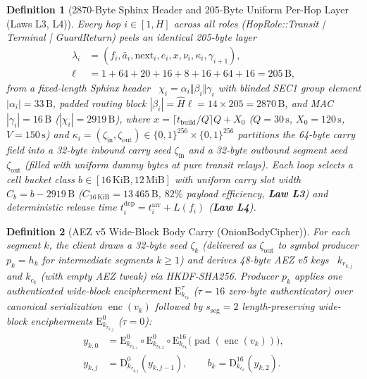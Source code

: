 \documentclass[journal]{IEEEtran}
\newtheorem{definition}{Definition}
\DeclareRobustCommand{\code}[1]{{\ttfamily\renewcommand{\_}{\textunderscore\allowbreak}#1}}
\begin{document}
\begin{definition}[2870-Byte Sphinx Header and 205-Byte Uniform Per-Hop Layer (Laws L3, L4)]\label{def:sphinx-header}
Every hop $i\in[1,H]$ across all roles (\code{HopRole::Transit | Terminal | GuardReturn})
peels an identical 205-byte layer
\[
\begin{aligned}
  \lambda_i &= (f_i,\bar{a}_i,\mathrm{next}_i,e_i,x,\nu_i,\kappa_i,\gamma_{i+1}),\\
  \ell &= 1+64+20+16+8+16+64+16=205\,\mathrm{B},
\end{aligned}
\]
from a fixed-length Sphinx header~\cite{Danezis2009} $\chi_i=\alpha_i\Vert\beta_i\Vert\gamma_i$ with blinded SEC1 group element $|\alpha_i|=33\,\mathrm{B}$, padded routing block $|\beta_i|=\hat{H}\ell=14\times 205=2870\,\mathrm{B}$, and MAC $|\gamma_i|=16\,\mathrm{B}$ ($|\chi_i|=2919\,\mathrm{B}$), where $x=\lceil t_{\mathrm{build}}/Q\rceil Q+X_0$ ($Q=30\,\mathrm{s}$, $X_0=120\,\mathrm{s}$, $V=150\,\mathrm{s}$) and $\kappa_i=(\zeta_{\mathrm{in}},\zeta_{\mathrm{out}})\in\{0,1\}^{256}\times\{0,1\}^{256}$ partitions the 64-byte carry field into a 32-byte inbound carry seed $\zeta_{\mathrm{in}}$ and a 32-byte outbound segment seed $\zeta_{\mathrm{out}}$ (filled with uniform dummy bytes at pure transit relays).
Each loop selects a cell bucket class $b\in[16\,\mathrm{KiB},12\,\mathrm{MiB}]$ with uniform carry slot width $C_b=b-2919\,\mathrm{B}$ ($C_{16\,\mathrm{KiB}}=13\,465\,\mathrm{B}$, $82\%$ payload efficiency, \textbf{Law L3}) and deterministic release time $t^{\mathrm{dep}}_i=t^{\mathrm{arr}}_i+L(f_i)$ (\textbf{Law L4}).
\end{definition}

\begin{definition}[AEZ v5 Wide-Block Body Carry (\code{OnionBodyCipher})]\label{def:aez-carry}
For each segment $k$, the client draws a 32-byte seed $\zeta_k$ (delivered as $\zeta_{\mathrm{out}}$ to symbol producer $p_k=h_k$ for intermediate segments $k\ge 1$) and derives
48-byte AEZ v5 keys~\cite{Hoang2015,AEZv5} $k_{r_{k,j}}$ and $k_{c_k}$ (with empty AEZ tweak) via
HKDF-SHA256.  Producer $p_k$ applies one authenticated wide-block encipherment
$\mathrm{E}^{\tau}_{k_{c_k}}$ ($\tau=16$ zero-byte authenticator) over canonical serialization $\operatorname{enc}(v_k)$ followed by
$s_{\mathrm{seg}}=2$ length-preserving wide-block encipherments $\mathrm{E}^0_{k_{r_{k,j}}}$ ($\tau=0$):
\[
\begin{aligned}
  y_{k,0} &= \mathrm{E}^0_{k_{r_{k,1}}}\circ\mathrm{E}^0_{k_{r_{k,2}}}\circ\mathrm{E}^{16}_{k_{c_k}}\bigl(\operatorname{pad}(\operatorname{enc}(v_k))\bigr),\\
  y_{k,j} &= \mathrm{D}^0_{k_{r_{k,j}}}(y_{k,j-1}),\qquad
  b_k = \mathrm{D}^{16}_{k_{c_k}}(y_{k,2}).
\end{aligned}
\]
\end{definition}
\end{document}

